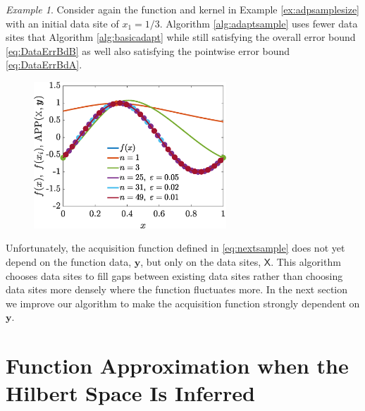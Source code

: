 \documentclass[]{mcom-l}
\theoremstyle{theorem}
\theoremstyle{remark}
\newtheorem{example}{Example}
\newcommand{\mX}{\mathsf{X}}
\newcommand{\by}{{\boldsymbol{y}}}
\begin{document}
\begin{example}
\label{ex:adpdataselect}
Consider again the function and kernel in Example \ref{ex:adpsamplesize} with an initial data site of $x_1=1/3$.
Algorithm \ref{alg:adaptsample} uses fewer data sites that Algorithm \ref{alg:basicadapt} while still satisfying the overall error bound \eqref{eq:DataErrBdB} as well also satisfying the pointwise error bound \eqref{eq:DataErrBdA}.
	

	
	
	\begin{figure}[H]
		\centering
		\includegraphics[height = 5.5cm]{ProgramsImages/Alg2_CurrinSineFun_Matern_adapt_th_EmpBayesAx_theta_1.eps}
		\caption{ \label{fig:ex2}}
	\end{figure}
	
\end{example}


Unfortunately, the acquisition function defined in \eqref{eq:nextsample} does not yet depend on the function data, $\by$, but only on the data sites, $\mX$.  This algorithm chooses data sites to fill gaps between existing data sites rather than choosing data sites more densely where the function fluctuates more.  In the next section we improve our algorithm to make the acquisition function strongly dependent on $\by$.





\section{Function Approximation when the Hilbert Space Is Inferred} \label{sec:adaptF}
\end{document}
